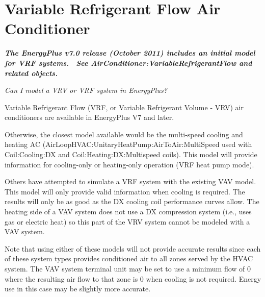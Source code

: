 \section{Variable Refrigerant Flow Air Conditioner}\label{variable-refrigerant-flow-air-conditioner}

\textbf{\emph{The EnergyPlus v7.0 release (October 2011) includes an initial model for VRF systems.~ See AirConditioner:VariableRefrigerantFlow and related objects.}}

\emph{Can I model a VRV or VRF system in EnergyPlus?}

Variable Refrigerant Flow (VRF, or Variable Refrigerant Volume - VRV) air conditioners are available in EnergyPlus V7 and later.

Otherwise, the closest model available would be the multi-speed cooling and heating AC (AirLoopHVAC:UnitaryHeatPump:AirToAir:MultiSpeed used with Coil:Cooling:DX and Coil:Heating:DX:Multispeed coils). This model will provide information for cooling-only or heating-only operation (VRF heat pump mode).

Others have attempted to simulate a VRF system with the existing VAV model. This model will only provide valid information when cooling is required. The results will only be as good as the DX cooling coil performance curves allow. The heating side of a VAV system does not use a DX compression system (i.e., uses gas or electric heat) so this part of the VRV system cannot be modeled with a VAV system.

Note that using either of these models will not provide accurate results since each of these system types provides conditioned air to all zones served by the HVAC system. The VAV system terminal unit may be set to use a minimum flow of 0 where the resulting air flow to that zone is 0 when cooling is not required. Energy use in this case may be slightly more accurate.

